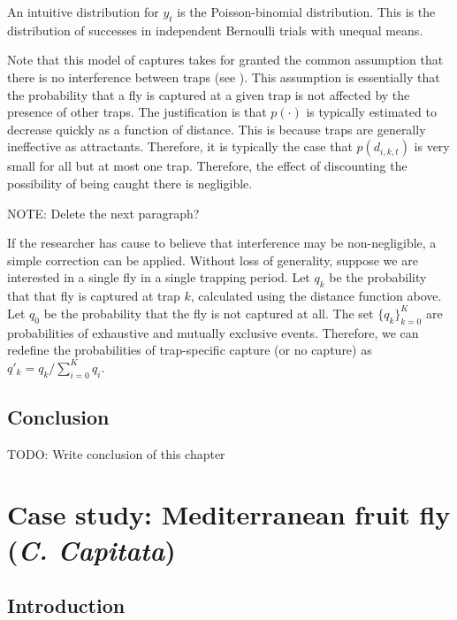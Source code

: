 \documentclass[
  oneside]{book}
\begin{document}
An intuitive distribution for \(y_t\) is the Poisson-binomial distribution. This is the distribution of successes in independent Bernoulli trials with unequal means.

Note that this model of captures takes for granted the common assumption that there is no interference between traps (see \citet{todocite}). This assumption is essentially that the probability that a fly is captured at a given trap is not affected by the presence of other traps. The justification is that \(p(\cdot)\) is typically estimated to decrease quickly as a function of distance. This is because traps are generally ineffective as attractants. Therefore, it is typically the case that \(p(d_{i, k, t})\) is very small for all but at most one trap. Therefore, the effect of discounting the possibility of being caught there is negligible.

NOTE: Delete the next paragraph?

If the researcher has cause to believe that interference may be non-negligible, a simple correction can be applied. Without loss of generality, suppose we are interested in a single fly in a single trapping period. Let \(q_k\) be the probability that that fly is captured at trap \(k\), calculated using the distance function above. Let \(q_0\) be the probability that the fly is not captured at all. The set \(\{q_k\}_{k=0}^K\) are probabilities of exhaustive and mutually exclusive events. Therefore, we can redefine the probabilities of trap-specific capture (or no capture) as \(q'_k = q_k / \sum_{i=0}^K q_i\).

\hypertarget{conclusion-1}{%
\section{Conclusion}\label{conclusion-1}}

TODO: Write conclusion of this chapter

\hypertarget{case-study-mediterranean-fruit-fly-c.-capitata}{%
\chapter{\texorpdfstring{Case study: Mediterranean fruit fly (\emph{C. Capitata})}{Case study: Mediterranean fruit fly (C. Capitata)}}\label{case-study-mediterranean-fruit-fly-c.-capitata}}

\hypertarget{introduction-3}{%
\section{Introduction}\label{introduction-3}}
\end{document}
